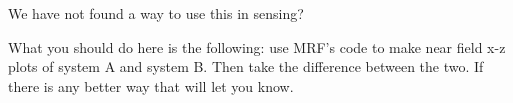 We have not found a way to use this in sensing?

What you should do here is the following: use MRF's code to make near field
x-z plots of system A and system B.  Then take the difference between the
two.  If there is any better way that will let you know.
